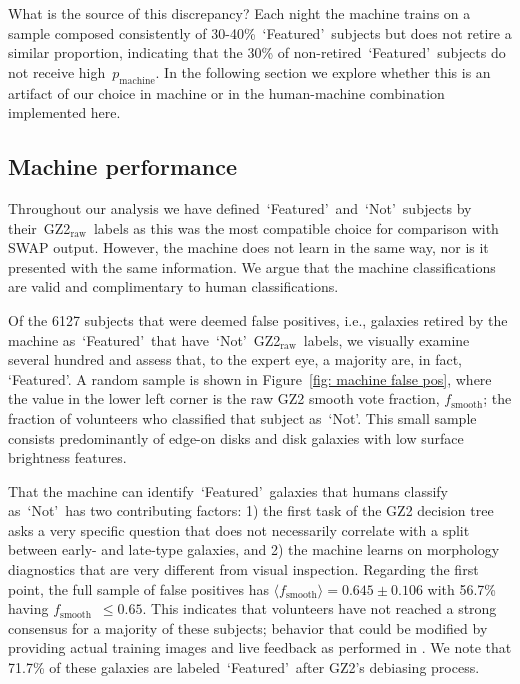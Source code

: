 \documentclass[twocolumn]{aastex6}
\newcommand{\feat}{`Featured'}
\newcommand{\notfeat}{`Not'}
\newcommand{\raw}{GZ2$_{\text{raw}}$}
\newcommand{\pmachine}{$p_{\mathrm{machine}}$}
\newcommand{\fsmooth}{$f_{\mathrm{smooth}}$}
\begin{document}
What is the source of this discrepancy? 
Each night the machine trains on a sample composed consistently of 30-40\%~\feat~subjects but does not retire a similar proportion, indicating
that the 30\% of non-retired~\feat~subjects do not receive high~\pmachine. 
In the following section we explore whether this is an artifact of our choice in machine 
or in the human-machine combination implemented here. 


\subsection{Machine performance}\label{sec: machine performance}

Throughout our analysis we have defined~\feat~and~\notfeat~subjects by 
their~\raw~labels as this was the most compatible choice for comparison with SWAP output.  
However, the machine does not learn in the same way, nor is it presented with the 
same information. We argue that the machine classifications are valid 
and complimentary to human classifications. 

Of the 6127 subjects that were deemed false positives, i.e., galaxies retired by the 
machine as~\feat~that have~\notfeat~\raw~labels, we visually examine several hundred
and assess that, to the expert eye, a majority are, in fact, \feat.  
A random sample is shown in Figure~\ref{fig: machine false pos}, where the value 
in the lower left corner is the raw GZ2 smooth vote fraction, \fsmooth; 
the fraction of volunteers who classified that subject as~\notfeat. 
This small sample consists predominantly of edge-on disks and disk 
galaxies with low surface brightness features. 

That the machine can identify~\feat~galaxies that humans classify 
as~\notfeat~has two contributing factors: 
1) the first task of the GZ2 decision tree asks a very specific question that 
does not necessarily correlate with a split between early- and late-type galaxies, and 
 2) the machine learns on morphology diagnostics that are very different from visual inspection. 
Regarding the first point, the full sample of false positives has $\langle f_{\mathrm{smooth}} \rangle = 0.645 \pm 0.106$  with 56.7\%  having \fsmooth~$\le 0.65$. This indicates that volunteers have not 
reached a strong consensus for a majority of these subjects; behavior that could 
be modified by providing actual training images and live feedback as performed in \cite{Marshall2016}. 
We note that 71.7\% of these galaxies are labeled~\feat~after GZ2's debiasing process. 
\end{document}
